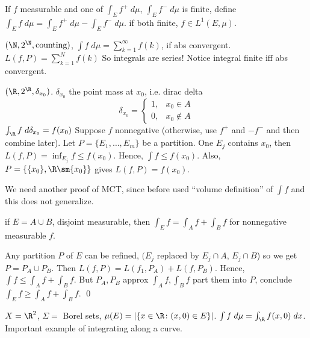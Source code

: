 \begin{dfn}
If $f$ measurable and one of $\int_E f^+ \; d\mu$, $\int_E f^- \; d\mu$ is finite, define $\int_E f \; d\mu= \int_E f^+ \; d\mu - \int_E f^- \; d\mu$. if both finite, $f \in L^1(E,\mu)$. 
\end{dfn}


\begin{ex}
$(\N,2^\N,\text{counting})$, $\int f \;d\mu= \sum_{k=1}^\infty f(k)$, if abs convergent. $L(f,P)= \sum_{k=1}^N f(k)$ So integrals are series! Notice integral finite iff abs convergent. 
\end{ex}


\begin{ex}
$(\R, 2^\R, \delta_{x_0})$. $\delta_{x_0}$ the point mass at $x_0$, i.e. dirac delta 
	\[
	\delta_{x_0}= 
	\begin{cases}
	1, & x_0 \in A \\
	0, & x_0 \notin A
	\end{cases}
	\]
$\int_\R f \; d\delta_{x_0}= f(x_0)$ \pf Suppose $f$ nonnegative (otherwise, use $f^+$ and $-f^-$ and then combine later). Let $P=\{E_1,\ldots,E_m\}$ be a partition. One $E_j$ contains $x_0$, then $L(f,P)= \inf_{E_j} f \leq f(x_0)$. Hence, $\int f \leq f(x_0)$. Also, $P = \{ \{x_0\}, \R \sm \{x_0\} \}$ gives $L(f,P)= f(x_0)$. 
\end{ex}


We need another proof of MCT, since before used ``volume definition'' of $\int f$ and this does not generalize. 


\begin{lem}
if $E= A \cup B$, disjoint measurable, then $\int_E f= \int_A f + \int_B f$ for nonnegative measurable $f$. 
\end{lem}

\pf Any partition $P$ of $E$ can be refined, $(E_j$ replaced by $E_j \cap A$, $E_j \cap B$) so we get $P= P_A \cup P_B$. Then $L(f,P)= L(f_1,P_A) + L(f,P_B)$. Hence, $\int f \leq \int_A f + \int_B f$. But $P_A,P_B$ approx $\int_A f, \int_B f$ part them into $P$, conclude $\int_E f \geq \int_A f + \int_B f$. \qed \\




\begin{ex}
$X= \R^2$, $\Sigma=$ Borel sets, $\mu(E)= | \{x \in \R \colon (x,0) \in E\}|$. $\int f \; d\mu= \int_\R f(x,0) \; dx$. Important example of integrating along a curve. 
\end{ex}


